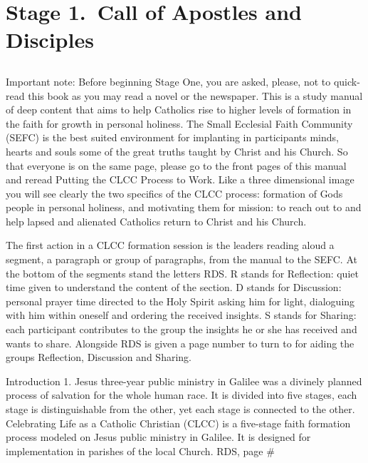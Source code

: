 \documentclass[oneside]{book}
\begin{document}

\chapter{Stage 1.\ Call of Apostles and Disciples}

\section*{} 

Important note: Before beginning Stage One, you are asked, please, not to
quick-read this book as you may read a novel or the newspaper. This is a study
manual of deep content that aims to help Catholics rise to higher levels of
formation in the faith for growth in personal holiness. The Small Ecclesial
Faith Community (SEFC) is the best suited environment for implanting in
participants minds, hearts and souls some of the great truths taught by Christ
and his Church. So that everyone is on the same page, please go to the front
pages of this manual and reread Putting the CLCC Process to Work. Like a three
dimensional image you will see clearly the two specifics of the CLCC process:
formation of Gods people in personal holiness, and motivating them for mission:
to reach out to and help lapsed and alienated Catholics return to Christ and his
Church.

The first action in a CLCC formation session is the leaders reading aloud a
segment, a paragraph or group of paragraphs, from the manual to the SEFC. At the
bottom of the segments stand the letters RDS. R stands for Reflection: quiet
time given to understand the content of the section. D stands for Discussion:
personal prayer time directed to the Holy Spirit asking him for light,
dialoguing with him within oneself and ordering the received insights. S stands
for Sharing: each participant contributes to the group the insights he or she
has received and wants to share. Alongside RDS is given a page number to turn to
for aiding the groups Reflection, Discussion and Sharing.


Introduction 1. Jesus three-year public ministry in Galilee was a divinely
planned process of salvation for the whole human race. It is divided into five
stages, each stage is distinguishable from the other, yet each stage is
connected to the other. Celebrating Life as a Catholic Christian (CLCC) is a
five-stage faith formation process modeled on Jesus public ministry in
Galilee. It is designed for implementation in parishes of the local Church.
RDS, page \#
\end{document}
